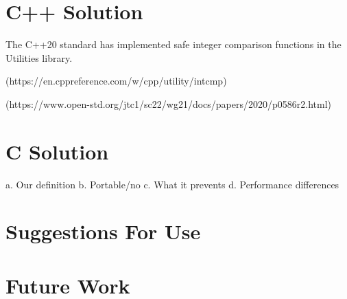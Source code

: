 \documentclass[11pt,letterpaper]{article}
\begin{document}
 




\section{C++ Solution}
\label{sec:cppimplementation}

The C++20 standard has implemented safe integer comparison functions in the Utilities library.

(https://en.cppreference.com/w/cpp/utility/intcmp)



(https://www.open-std.org/jtc1/sc22/wg21/docs/papers/2020/p0586r2.html)



\blindtext
{}

\section{C Solution}
\label{sec:cimplementation}
a.	Our definition
b.	Portable/no
c.	What it prevents
d.	Performance differences

\section{Suggestions For Use}
\label{sec:suggestions}

\section{Future Work}
\label{sec:futurework}



\printindex
\end{document}
